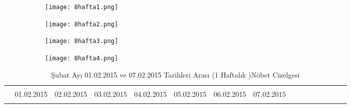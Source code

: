\documentclass[12pt, a4paper]{article}
\begin{document}
\begin{flushleft}
\begin{figure}[htbp]
	\centering
	\begin{subfigure}[b]{0.8\textwidth}
		\centering
		\texttt{[image: 8hafta1.png]}
		
		\label{fig:resim1}
	\end{subfigure}
	\hfill
	\begin{subfigure}[b]{0.8\textwidth}
		\centering
		\texttt{[image: 8hafta2.png]}
		
		\label{fig:resim1}
	\end{subfigure}
	\hfill
	\begin{subfigure}[b]{0.8\textwidth}
		\centering
		\texttt{[image: 8hafta3.png]}
		
		\label{fig:resim1}
	\end{subfigure}
	\hfill
	\begin{subfigure}[b]{0.8\textwidth}
		\centering
		\texttt{[image: 8hafta4.png]}
		
		
	\end{subfigure}
	\hfill
\end{figure}

\begin{center}
	\begin{landscape}
		
		
		\begin{table}
			\caption{Şubat Ayı 01.02.2015 ve 07.02.2015 Tarihleri Arası (1 Haftalık )Nöbet Cizelgesi}
			\begin{tabular}{|p{3cm}||p{2cm}||p{2cm}||p{3cm}||p{3cm}||p{3cm}||p{3cm}||p{2cm}|c|c|c|c|c|c|c|c|}
				\rowcolor{red}
				
				\hline \multicolumn{8}{|c|}{Şubat Ayı Hafta - 1} \\
				\rowcolor{yellow}
				\hline  & 01.02.2015 & 02.02.2015 & 03.02.2015 & 04.02.2015&05.02.2015&06.02.2015& 07.02.2015 \\
				\rowcolor{lightgray}
				

\end{tabular}
\end{table}
\end{landscape}
\end{center}
\end{flushleft}
\end{document}
